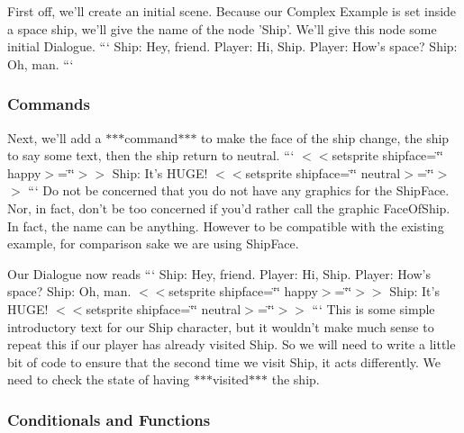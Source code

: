 First off, we'll create an initial scene. Because our Complex Example is set inside a space ship, we'll give the name of the node 'Ship'. We'll give this node some initial Dialogue. ``` Ship\-: Hey, friend. Player\-: Hi, Ship. Player\-: How's space? Ship\-: Oh, man. ``` \subsubsection*{Commands}

Next, we'll add a $\ast$$\ast$$\ast$command$\ast$$\ast$$\ast$ to make the face of the ship change, the ship to say some text, then the ship return to neutral. ``` $<$$<$setsprite shipface=\char`\"{}\char`\"{} happy$>$=\char`\"{}\char`\"{}$>$$>$ Ship\-: It's H\-U\-G\-E! $<$$<$setsprite shipface=\char`\"{}\char`\"{} neutral$>$=\char`\"{}\char`\"{}$>$$>$ ``` Do not be concerned that you do not have any graphics for the Ship\-Face. Nor, in fact, don't be too concerned if you'd rather call the graphic Face\-Of\-Ship. In fact, the name can be anything. However to be compatible with the existing example, for comparison sake we are using Ship\-Face.

Our Dialogue now reads ``` Ship\-: Hey, friend. Player\-: Hi, Ship. Player\-: How's space? Ship\-: Oh, man. $<$$<$setsprite shipface=\char`\"{}\char`\"{} happy$>$=\char`\"{}\char`\"{}$>$$>$ Ship\-: It's H\-U\-G\-E! $<$$<$setsprite shipface=\char`\"{}\char`\"{} neutral$>$=\char`\"{}\char`\"{}$>$$>$ ``` This is some simple introductory text for our Ship character, but it wouldn't make much sense to repeat this if our player has already visited Ship. So we will need to write a little bit of code to ensure that the second time we visit Ship, it acts differently. We need to check the state of having $\ast$$\ast$$\ast$visited$\ast$$\ast$$\ast$ the ship.

\subsubsection*{Conditionals and Functions}

